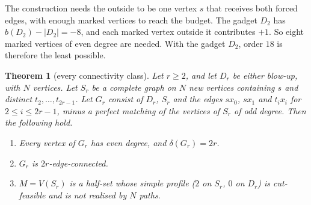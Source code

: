 \documentclass[11pt]{amsart}
\newtheorem{theorem}{Theorem}
\theoremstyle{definition}
\begin{document}
The construction needs the outside to be one vertex $s$ that receives both forced edges, with enough
marked vertices to reach the budget. The gadget $D_2$ has $b(D_2)-|D_2|=-8$, and each marked vertex
outside it contributes $+1$. So eight marked vertices of even degree are needed. With the gadget
$D_2$, order $18$ is therefore the least possible.

\begin{theorem}[every connectivity class]\label{thm:allclasses}
Let $r\ge2$, and let $D_r$ be either blow-up, with $N$ vertices. Let $S_r$ be a complete graph on $N$
new vertices containing $s$ and distinct $t_2,\dots,t_{2r-1}$. Let $G_r$ consist of $D_r$, $S_r$ and
the edges $sx_0$, $sx_1$ and $t_ix_i$ for $2\le i\le 2r-1$, minus a perfect matching of the vertices of
$S_r$ of odd degree. Then the following hold.
\begin{enumerate}
\item Every vertex of $G_r$ has even degree, and $\delta(G_r)=2r$.
\item $G_r$ is $2r$-edge-connected.
\item $M=V(S_r)$ is a half-set whose simple profile ($2$ on $S_r$, $0$ on $D_r$) is cut-feasible and
is not realised by $N$ paths.
\end{enumerate}
\end{theorem}
\end{document}
